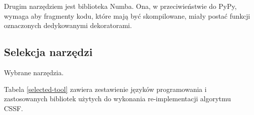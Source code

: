 \documentclass[11pt, a4paper]{article}
\begin{document}
\begin{sloppypar}

    Drugim narzędziem jest biblioteka Numba\cite{Numba_Article}\cite{Numba_Doc}. Ona, w przeciwieństwie
    do PyPy, wymaga aby fragmenty kodu, które mają być skompilowane, miały postać
    funkcji oznaczonych dedykowanymi dekoratorami.



    \subsection{Selekcja narzędzi}
    \FloatBarrier
    \begin{table}[ht]
      \centering
      
      \caption{Wybrane narzędzia.}
      \label{selected-tool}
    \end{table}
    \FloatBarrier

    Tabela \ref{selected-tool} zawiera zestawienie języków programowania i zastosowanych
    bibliotek użytych do wykonania re-implementacji algorytmu CSSF.


\end{sloppypar}
\end{document}
